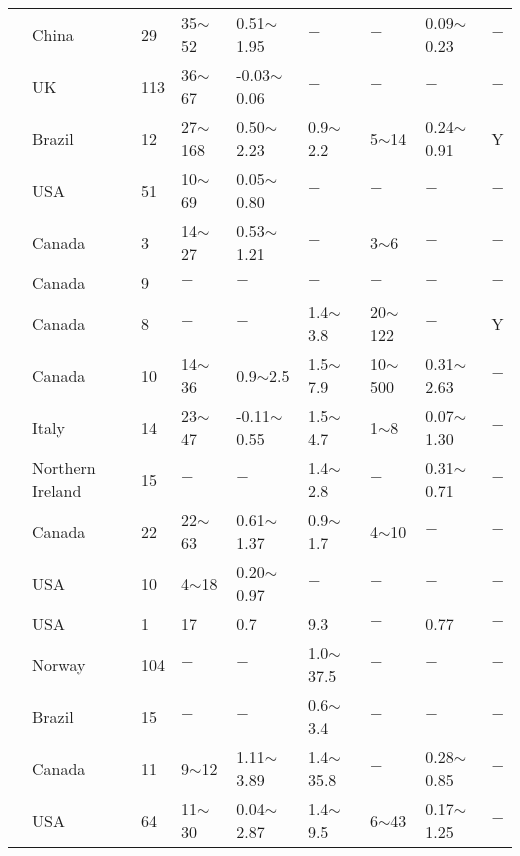 {\begin{longtable}{lllllllll}
    \citet{Clough198045} & China & 29    & 35$\sim$52 & 0.51$\sim$1.95 & $-$     & $-$     & 0.09$\sim$0.23 & $-$ \\
    \citet{Cooling1942251} & UK    & 113   & 36$\sim$67 & -0.03$\sim$0.06 & $-$     & $-$     & $-$     & $-$ \\
    \citet{Coutinho20072049} & Brazil & 12    & 27$\sim$168 & 0.50$\sim$2.23 & 0.9$\sim$2.2 & 5$\sim$14  & 0.24$\sim$0.91 & Y \\
    \citet{Cox19791147} & USA   & 51    & 10$\sim$69 & 0.05$\sim$0.80 & $-$     & $-$     & $-$     & $-$ \\
    \citet{Crawford195936} & Canada & 3     & 14$\sim$27 & 0.53$\sim$1.21 & $-$     & 3$\sim$6   & $-$     & $-$ \\
    \citet{Crawford1964227} & Canada & 9     & $-$     & $-$     & $-$     & $-$     & $-$     & $-$ \\
    \citet{Crawford1991103} & Canada & 8     & $-$     & $-$     & 1.4$\sim$3.8 & 20$\sim$122 & $-$     & Y \\
    \citet{Crawford196531} & Canada & 10    & 14$\sim$36 & 0.9$\sim$2.5 & 1.5$\sim$7.9 & 10$\sim$500 & 0.31$\sim$2.63 & $-$ \\
    \citet{Croce196981} & Italy & 14    & 23$\sim$47 & -0.11$\sim$0.55 & 1.5$\sim$4.7 & 1$\sim$8   & 0.07$\sim$1.30 & $-$ \\
    \citet{Crooks1981685} & Northern Ireland & 15    & $-$     & $-$     & 1.4$\sim$2.8 & $-$     & 0.31$\sim$0.71 & $-$ \\
    \citet{Crooks1976293} & Canada & 22    & 22$\sim$63 & 0.61$\sim$1.37 & 0.9$\sim$1.7 & 4$\sim$10  & $-$     & $-$ \\
    \citet{Cummings1950275} & USA   & 10    & 4$\sim$18  & 0.20$\sim$0.97 & $-$     & $-$     & $-$     & $-$ \\
    \citet{D'Appolonia1971881} & USA   & 1     & 17    & 0.7   & 9.3   & $-$     & 0.77  & $-$ \\
    \citet{D'Appolonia1972126} & Norway & 104   & $-$     & $-$     & 1.0$\sim$37.5 & $-$     & $-$     & $-$ \\
    \citet{DaCruz196373} & Brazil & 15    & $-$     & $-$     & 0.6$\sim$3.4 & $-$     & $-$     & $-$ \\
    \citet{Dascal1975297} & Canada & 11    & 9$\sim$12  & 1.11$\sim$3.89 & 1.4$\sim$35.8 & $-$     & 0.28$\sim$0.85 & $-$ \\
    \citet{DeGroot2003695} & USA   & 64    & 11$\sim$30 & 0.04$\sim$2.87 & 1.4$\sim$9.5 & 6$\sim$43  & 0.17$\sim$1.25 & $-$ \\

\end{longtable}}
